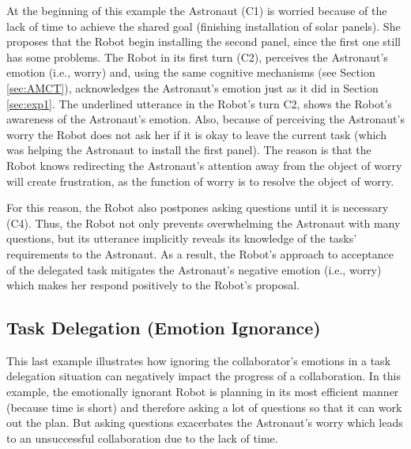 At the beginning of this example the Astronaut (C1) is worried because of the
lack of time to achieve the shared goal (finishing installation of solar
panels). She proposes that the Robot begin installing the second panel, since
the first one still has some problems. The Robot in its first turn (C2),
perceives the Astronaut's emotion (i.e., worry) and, using the same cognitive
mechanisms (see Section \ref{sec:AMCT}), acknowledges the Astronaut's emotion
just as it did in Section \ref{sec:exp1}. The underlined utterance in the
Robot's turn C2, shows the Robot's awareness of the Astronaut's emotion. Also,
because of perceiving the Astronaut's worry the Robot does not ask her if it is
okay to leave the current task (which was helping the Astronaut to install the
first panel). The reason is that the Robot knows redirecting the Astronaut's
attention away from the object of worry will create frustration, as the function
of worry is to resolve the object of worry.


For this reason, the Robot also postpones asking questions until it is necessary
(C4). Thus, the Robot not only prevents overwhelming the Astronaut with many
questions, but its utterance implicitly reveals its knowledge of the tasks'
requirements to the Astronaut. As a result, the Robot's approach to acceptance
of the delegated task mitigates the Astronaut's negative emotion (i.e., worry)
which makes her respond positively to the Robot's proposal.

\subsection{Task Delegation (Emotion Ignorance)}
\label{sec:exp4}

This last example illustrates how ignoring the collaborator's emotions in a task
delegation situation can negatively impact the progress of a collaboration. In
this example, the emotionally ignorant Robot is planning in its most efficient
manner (because time is short) and therefore asking a lot of questions so that
it can work out the plan. But asking questions exacerbates the Astronaut's worry
which leads to an unsuccessful collaboration due to the lack of time.

